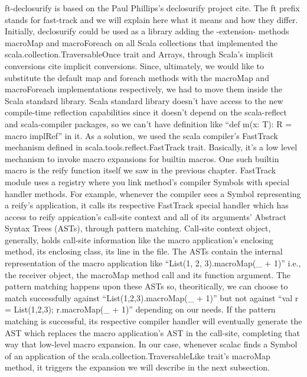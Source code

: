 ft-declosurify is based on the  Paul Phillips's declosurify project {cite}. The
ft prefix stands for fast-track and we will explain here what it
means and how they differ. Initially, declosurify could be used as a library
adding the -extension- methods macroMap and macroForeach on all Scala
collections that implemented the scala.collection.TraversableOnce trait and
Arrays, through Scala's implicit conversions {cite implicit conversions}. Since,
ultimately, we would like to substitute the default map and foreach methods
with the macroMap and macroForeach implementations respectively, we had to move
them inside the Scala standard library. Scala standard library
doesn't have access to the new compile-time reflection capabilities since it
doesn't depend on the
scala-reflect and scala-compiler packages, so we can't have definition like
``def m(x: T): R = macro implRef'' in it. As a solution, we
used the scala
compiler's FastTrack mechanism defined in scala.tools.reflect.FastTrack
trait. Basically, it's a low level mechanism to invoke macro expansions for
builtin macros. One such builtin macro is the reify function itself  we saw in
the previous chapter. FastTrack module uses a registry where you link
method's compiler Symbols with special handler methods. For example, whenever
the compiler sees a Symbol representing a reify's application, it calls its
respective FastTrack special handler which has access to reify appication's
call-site context and all of  its arguments' Abstract Syntax Trees (ASTs),
through pattern matching. Call-site context object, generally, holds call-site
information like the macro application's enclosing method, its enclosing class,
its line in the file. The ASTs contain the internal representation of the macro
application like ``List(1, 2, 3).macroMap(_ + 1)'' i.e., the receiver object,
the macroMap method call and its function argument. The pattern
matching happens upon these ASTs so, theoritically, we can choose to match
successfully against ``List(1,2,3).macroMap(_ + 1)'' but not against ``val r =
List(1,2,3); r.macroMap(_ + 1)'' depending on our needs. If the pattern matching
is successful, its respective compiler handler will eventually generate the AST
which replaces the macro application's AST in the call-site, completing that way
that low-level macro expansion. In our case, whenever scalac finds a Symbol of
an application of the scala.collection.TraversableLike trait's macroMap
method, it triggers the expansion we will describe in the next
subsection.

